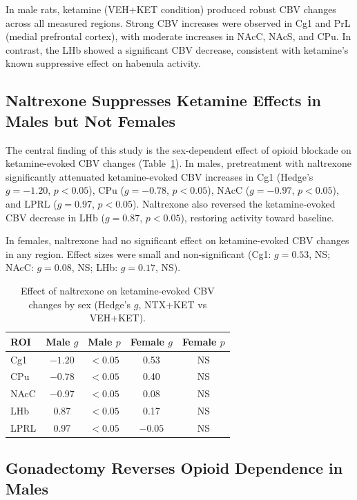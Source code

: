 \documentclass[11pt]{article}
\begin{document}
In male rats, ketamine (VEH+KET condition) produced robust CBV changes across all measured regions. Strong CBV increases were observed in Cg1 and PrL (medial prefrontal cortex), with moderate increases in NAcC, NAcS, and CPu. In contrast, the LHb showed a significant CBV decrease, consistent with ketamine's known suppressive effect on habenula activity.

\subsection{Naltrexone Suppresses Ketamine Effects in Males but Not Females}

The central finding of this study is the sex-dependent effect of opioid blockade on ketamine-evoked CBV changes (Table~\ref{tab:sexeffects}). In males, pretreatment with naltrexone significantly attenuated ketamine-evoked CBV increases in Cg1 (Hedge's $g = -1.20$, $p < 0.05$), CPu ($g = -0.78$, $p < 0.05$), NAcC ($g = -0.97$, $p < 0.05$), and LPRL ($g = 0.97$, $p < 0.05$). Naltrexone also reversed the ketamine-evoked CBV decrease in LHb ($g = 0.87$, $p < 0.05$), restoring activity toward baseline.

In females, naltrexone had no significant effect on ketamine-evoked CBV changes in any region. Effect sizes were small and non-significant (Cg1: $g = 0.53$, NS; NAcC: $g = 0.08$, NS; LHb: $g = 0.17$, NS).

\begin{table}[h]
\centering
\caption{Effect of naltrexone on ketamine-evoked CBV changes by sex (Hedge's $g$, NTX+KET vs VEH+KET).}
\label{tab:sexeffects}
\begin{tabular}{lcccc}
\toprule
ROI & Male $g$ & Male $p$ & Female $g$ & Female $p$ \\
\midrule
Cg1 & $-1.20$ & $< 0.05$ & 0.53 & NS \\
CPu & $-0.78$ & $< 0.05$ & 0.40 & NS \\
NAcC & $-0.97$ & $< 0.05$ & 0.08 & NS \\
LHb & 0.87 & $< 0.05$ & 0.17 & NS \\
LPRL & 0.97 & $< 0.05$ & $-0.05$ & NS \\
\bottomrule
\end{tabular}
\end{table}

\subsection{Gonadectomy Reverses Opioid Dependence in Males}
\end{document}

